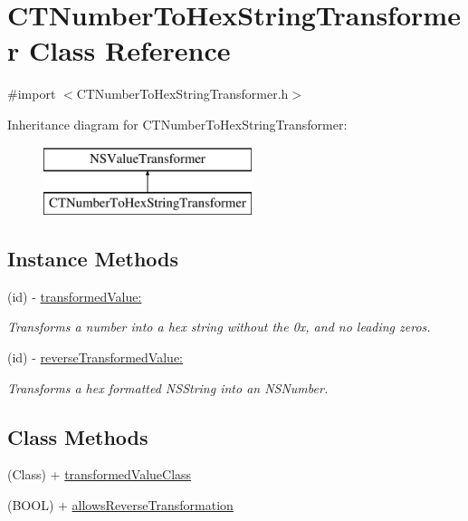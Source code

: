 \hypertarget{interface_c_t_number_to_hex_string_transformer}{\section{C\-T\-Number\-To\-Hex\-String\-Transformer Class Reference}
\label{interface_c_t_number_to_hex_string_transformer}
}


{\ttfamily \#import $<$C\-T\-Number\-To\-Hex\-String\-Transformer.\-h$>$}

Inheritance diagram for C\-T\-Number\-To\-Hex\-String\-Transformer\-:\begin{figure}[H]
\begin{center}
\leavevmode
\includegraphics[height=2.000000cm]{interface_c_t_number_to_hex_string_transformer}
\end{center}
\end{figure}
\subsection*{Instance Methods}
\begin{DoxyCompactItemize}
\item 
(id) -\/ \hyperlink{interface_c_t_number_to_hex_string_transformer_ae4be8dcda663f1dbc6e12a8eb915ce34}{transformed\-Value\-:}
\begin{DoxyCompactList}\small\item\em Transforms a number into a hex string without the 0x, and no leading zeros. \end{DoxyCompactList}\item 
(id) -\/ \hyperlink{interface_c_t_number_to_hex_string_transformer_a00b54742110417a4a932da2a0277c7ad}{reverse\-Transformed\-Value\-:}
\begin{DoxyCompactList}\small\item\em Transforms a hex formatted N\-S\-String into an N\-S\-Number. \end{DoxyCompactList}\end{DoxyCompactItemize}
\subsection*{Class Methods}
\begin{DoxyCompactItemize}
\item 
(Class) + \hyperlink{interface_c_t_number_to_hex_string_transformer_a2ab81e9c3b57ee99a0d25c1f240ed59b}{transformed\-Value\-Class}
\item 
(B\-O\-O\-L) + \hyperlink{interface_c_t_number_to_hex_string_transformer_ab37052d53b55b38997a5c3c29f597134}{allows\-Reverse\-Transformation}
\end{DoxyCompactItemize}


